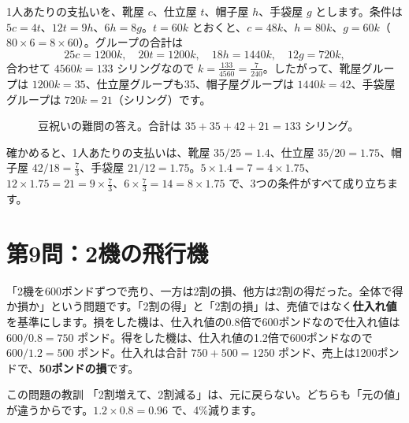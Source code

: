 \documentclass[a4paper,11pt,openany]{ltjsbook}
\begin{document}
1人あたりの支払いを、靴屋 $c$、仕立屋 $t$、帽子屋 $h$、手袋屋 $g$ とします。条件は $5c=4t$、$12t=9h$、$6h=8g$。$t=60k$ とおくと、$c=48k$、$h=80k$、$g=60k$（$80\times6=8\times60$）。グループの合計は
\[
25c=1200k,\quad 20t=1200k,\quad 18h=1440k,\quad 12g=720k,
\]
合わせて $4560k=133$ シリングなので $k=\tfrac{133}{4560}=\tfrac{7}{240}$。したがって、靴屋グループは $1200k=35$、仕立屋グループも35、帽子屋グループは $1440k=42$、手袋屋グループは $720k=21$（シリング）です。

\begin{figure}[htbp]
\centering
{}
\caption{豆祝いの難問の答え。合計は $35+35+42+21=133$ シリング。}
\end{figure}

確かめると、1人あたりの支払いは、靴屋 $35/25=1.4$、仕立屋 $35/20=1.75$、帽子屋 $42/18=\tfrac73$、手袋屋 $21/12=1.75$。$5\times1.4=7=4\times1.75$、$12\times1.75=21=9\times\tfrac73$、$6\times\tfrac73=14=8\times1.75$ で、3つの条件がすべて成り立ちます。

\section{第9問：2機の飛行機}

「2機を600ポンドずつで売り、一方は2割の損、他方は2割の得だった。全体で得か損か」という問題です。「2割の得」と「2割の損」は、売値ではなく\textbf{仕入れ値}を基準にします。損をした機は、仕入れ値の0.8倍で600ポンドなので仕入れ値は $600/0.8=750$ ポンド。得をした機は、仕入れ値の1.2倍で600ポンドなので $600/1.2=500$ ポンド。仕入れは合計 $750+500=1250$ ポンド、売上は1200ポンドで、\textbf{50ポンドの損}です。

\begin{pointbox}{この問題の教訓}
「2割増えて、2割減る」は、元に戻らない。どちらも「元の値」が違うからです。$1.2\times0.8=0.96$ で、4\%減ります。
\end{pointbox}
\end{document}
